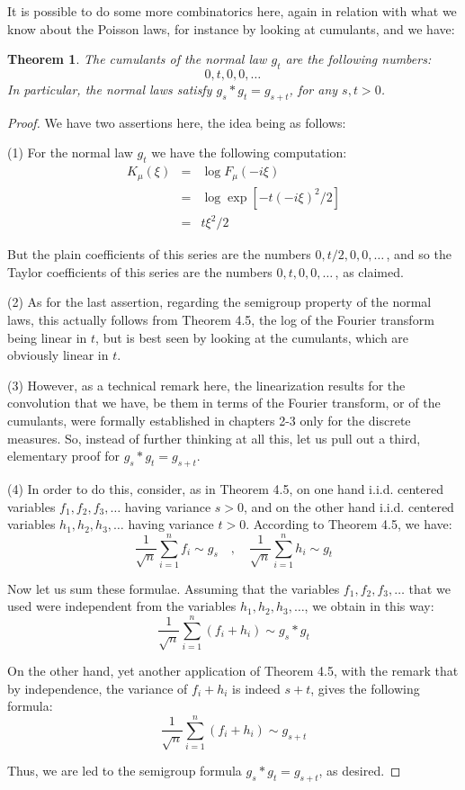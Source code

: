 \documentclass[12pt]{amsbook}
\newtheorem{theorem}{Theorem}[chapter]
\begin{document}
It is possible to do some more combinatorics here, again in relation with what we know about the Poisson laws, for instance by looking at cumulants, and we have:

\begin{theorem}
The cumulants of the normal law $g_t$ are the following numbers:
$$0,t,0,0,\ldots\,$$
In particular, the normal laws satisfy $g_s*g_t=g_{s+t}$, for any $s,t>0$.
\end{theorem}

\begin{proof}
We have two assertions here, the idea being as follows:

\medskip

(1) For the normal law $g_t$ we have the following computation:
\begin{eqnarray*}
K_\mu(\xi)
&=&\log F_\mu(-i\xi)\\
&=&\log\exp\left[-t(-i\xi)^2/2\right]\\
&=&t\xi^2/2
\end{eqnarray*}

But the plain coefficients of this series are the numbers $0,t/2,0,0,\ldots\,$, and so the Taylor coefficients of this series are the numbers $0,t,0,0,\ldots\,$, as claimed. 

\medskip

(2) As for the last assertion, regarding the semigroup property of the normal laws, this actually follows from Theorem 4.5, the log of the Fourier transform being linear in $t$, but is best seen by looking at the cumulants, which are obviously linear in $t$.

\medskip

(3) However, as a technical remark here, the linearization results for the convolution that we have, be them in terms of the Fourier transform, or of the cumulants, were formally established in chapters 2-3 only for the discrete measures. So, instead of further thinking at all this, let us pull out a third, elementary proof for $g_s*g_t=g_{s+t}$.

\medskip

(4) In order to do this, consider, as in Theorem 4.5, on one hand i.i.d. centered variables $f_1,f_2,f_3,\ldots$ having variance $s>0$, and on the other hand i.i.d. centered variables $h_1,h_2,h_3,\ldots$ having variance $t>0$. According to Theorem 4.5, we have:
$$\frac{1}{\sqrt{n}}\sum_{i=1}^nf_i\sim g_s\quad,\quad 
\frac{1}{\sqrt{n}}\sum_{i=1}^nh_i\sim g_t$$

Now let us sum these formulae. Assuming that the variables $f_1,f_2,f_3,\ldots$ that we used were independent from the variables $h_1,h_2,h_3,\ldots$, we obtain in this way:
$$\frac{1}{\sqrt{n}}\sum_{i=1}^n(f_i+h_i)\sim g_s*g_t$$

On the other hand, yet another application of Theorem 4.5, with the remark that by independence, the variance of $f_i+h_i$ is indeed $s+t$, gives the following formula:
$$\frac{1}{\sqrt{n}}\sum_{i=1}^n(f_i+h_i)\sim g_{s+t}$$

Thus, we are led to the semigroup formula $g_s*g_t=g_{s+t}$, as desired.
\end{proof}
\end{document}
